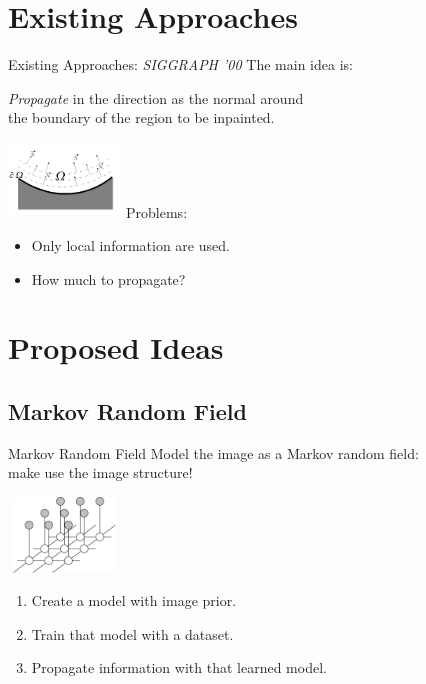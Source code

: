 \documentclass{beamer}
\begin{document}
\section{Existing Approaches}
\begin{frame}{Existing Approaches: \emph{SIGGRAPH '00}}
The main idea is:
\begin{center}
\hspace*{-2cm}
\emph{Propagate} in the direction as the normal around \\\hspace*{-2cm}the boundary of the region to be inpainted.
\end{center}
\vspace*{-2cm}
\hspace*{8.5cm}
\includegraphics[height=2cm, width=3cm]{prop.png}
\pause
\vspace*{1cm}
Problems:
\begin{itemize}
\item Only local information are used.
\item How much to propagate?
\end{itemize}

\end{frame}



\section{Proposed Ideas}
\subsection{Markov Random Field}
\begin{frame}{Markov Random Field}
Model the image as a Markov random field:\\
\quad make use the image structure!


\hspace*{8cm}
\includegraphics[height=2cm, width=3cm]{mrf.jpg}

\vspace*{-1cm}
\begin{enumerate}
\item Create a model with image prior.
\item Train that model with a dataset.
\item Propagate information with that learned model.
\end{enumerate}
\end{frame}
\end{document}
